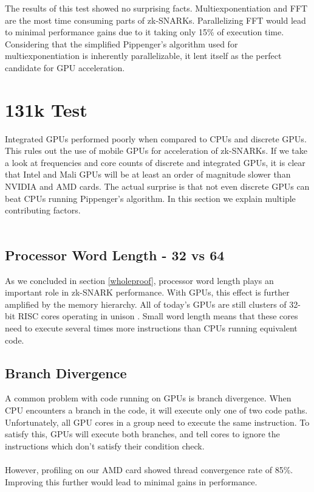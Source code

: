 The results of this test showed no surprising facts. Multiexponentiation and FFT are the most time consuming parts of zk-SNARKs. Parallelizing FFT would lead to minimal performance gains due to it taking only 15\% of execution time. Considering that the simplified Pippenger's algorithm used for multiexponentiation is inherently parallelizable, it lent itself as the perfect candidate for GPU acceleration.

\section{131k Test}

Integrated GPUs performed poorly when compared to CPUs and discrete GPUs. This rules out the use of mobile GPUs for acceleration of zk-SNARKs. If we take a look at frequencies and core counts of discrete and integrated GPUs, it is clear that Intel and Mali GPUs will be at least an order of magnitude slower than NVIDIA and AMD cards. The actual surprise is that not even discrete GPUs can beat CPUs running Pippenger's algorithm. In this section we explain multiple contributing factors.\\
\\
\subsection{Processor Word Length - 32 vs 64}

As we concluded in section \ref{wholeproof}, processor word length plays an important role in zk-SNARK performance. With GPUs, this effect is further amplified by the memory hierarchy. All of today's GPUs are still clusters of 32-bit RISC cores operating in unison \cite{nvidiapascalinstructions, amdpolarisinstructions}. Small word length means that these cores need to execute several times more instructions than CPUs running equivalent code.\\

\subsection{Branch Divergence}

A common problem with code running on GPUs is branch divergence. When CPU encounters a branch in the code, it will execute only one of two code paths. Unfortunately, all GPU cores in a group need to execute the same instruction. To satisfy this, GPUs will execute both branches, and tell cores to ignore the instructions which don't satisfy their condition check.\\
\\
However, profiling on our AMD card showed thread convergence rate of 85\%. Improving this further would lead to minimal gains in performance.

